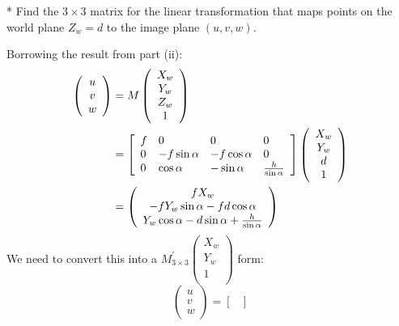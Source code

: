 \begin{questions}
\begin{parts}
\begin{subparts}
    \subpart
    * Find the $3 \times 3$ matrix for the linear transformation that maps points on the world plane $Z_w = d$ to the image plane $(u, v, w)$.
    \begin{solution}
        Borrowing the result from part (ii):
        \[
        \begin{split}
        \left( \begin{array} { c } { u } \\ { v } \\ { w } \end{array} \right) 
        &= M \left( \begin{array} { c } { X _ { w } } \\ { Y _ { w } } \\ { Z _ { w } } \\ { 1 } \end{array} \right) \\
        &= \left[ \begin{array} { l l l l } { f } & { 0 } & { 0 } & { 0 } \\ { 0 } & { -f\sin\alpha } & { -f\cos\alpha } & { 0 } \\ { 0 } & { \cos \alpha } & { -\sin \alpha } & { \frac{h}{\sin \alpha} } \end{array} \right] \left( \begin{array} { c } { X _ { w } } \\ { Y _ { w } } \\ { d } \\ { 1 } \end{array} \right) \\
        &= \left( \begin{array} { c } { f X _ { w } } \\ { - f Y _ { w } \sin \alpha - f d \cos \alpha } \\ { Y _ { w } \cos \alpha - d \sin \alpha + \frac{h}{\sin \alpha} } \end{array} \right) \\
        \end{split}
        \]
    We need to convert this into a $M ^ {'} _ {3 \times 3} \left( \begin{array} {c} X _ {w} \\ Y _ {w} \\ 1 \\ \end{array} \right)$ form:
    \[  \left( \begin{array} { c } { u } \\ { v } \\ { w }            \end{array} \right) = \begin{bmatrix}

\end{bmatrix}\]
\end{solution}
\end{subparts}
\end{parts}
\end{questions}
